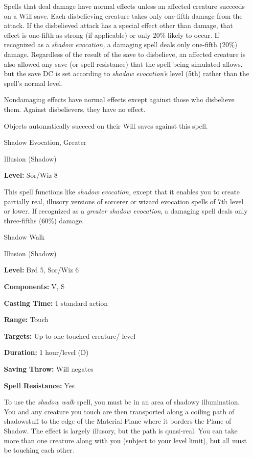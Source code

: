 \documentclass{article}
\begin{document}
Spells that deal damage have normal effects unless an affected creature succeeds 
on a Will save. Each disbelieving creature takes only one-fifth damage from the 
attack. If the disbelieved attack has a special effect other than damage, that 
effect is one-fifth as strong (if applicable) or only 20\% likely to occur. If 
recognized as a \textit{shadow evocation, }a damaging spell deals only one-fifth 
(20\%) damage. Regardless of the result of the save to disbelieve, an affected 
creature is also allowed any save (or spell resistance) that the spell being simulated 
allows, but the save DC is set according to \textit{shadow evocation'}s level (5th) 
rather than the spell's normal level.

Nondamaging effects have normal effects except against those who disbelieve them. 
Against disbelievers, they have no effect.

Objects automatically succeed on their Will saves against this spell.

\vspace{12pt}
Shadow Evocation, Greater

Illusion (Shadow)

\textbf{Level:} Sor/Wiz 8

This spell functions like \textit{shadow evocation, }except that it enables you 
to create partially real, illusory versions of sorcerer or wizard evocation spells 
of 7th level or lower. If recognized as a \textit{greater shadow evocation}, a 
damaging spell deals only three-fifths (60\%) damage.

\vspace{12pt}
Shadow Walk

Illusion (Shadow)

\textbf{Level:} Brd 5, Sor/Wiz 6

\textbf{Components:} V, S

\textbf{Casting Time:} 1 standard action

\textbf{Range:} Touch

\textbf{Targets:} Up to one touched creature/ level

\textbf{Duration:} 1 hour/level (D)

\textbf{Saving Throw: }Will negates

\textbf{Spell Resistance:} Yes

To use the \textit{shadow walk }spell, you must be in an area of shadowy illumination. 
You and any creature you touch are then transported along a coiling path of shadowstuff 
to the edge of the Material Plane where it borders the Plane of Shadow. The effect 
is largely illusory, but the path is quasi-real. You can take more than one creature 
along with you (subject to your level limit), but all must be touching each other.
\end{document}
